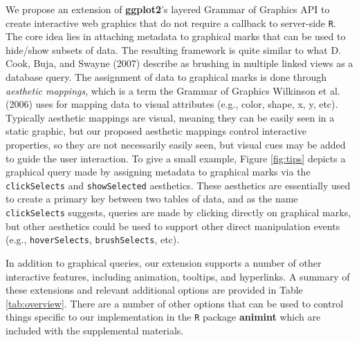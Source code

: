 \documentclass[12pt,]{article}
\theoremstyle{definition}
\theoremstyle{definition}
\theoremstyle{definition}
\theoremstyle{remark}
\begin{document}
We propose an extension of \textbf{ggplot2}'s layered Grammar of
Graphics API to create interactive web graphics that do not require a
callback to server-side \texttt{R}. The core idea lies in attaching
metadata to graphical marks that can be used to hide/show subsets of
data. The resulting framework is quite similar to what D. Cook, Buja,
and Swayne (2007) describe as brushing in multiple linked views as a
database query. The assignment of data to graphical marks is done
through \emph{aesthetic mappings}, which is a term the Grammar of
Graphics Wilkinson et al. (2006) uses for mapping data to visual
attributes (e.g., color, shape, x, y, etc). Typically aesthetic mappings
are visual, meaning they can be easily seen in a static graphic, but our
proposed aesthetic mappings control interactive properties, so they are
not necessarily easily seen, but visual cues may be added to guide the
user interaction. To give a small example, Figure \ref{fig:tips} depicts
a graphical query made by assigning metadata to graphical marks via the
\texttt{clickSelects} and \texttt{showSelected} aesthetics. These
aesthetics are essentially used to create a primary key between two
tables of data, and as the name \texttt{clickSelects} suggests, queries
are made by clicking directly on graphical marks, but other aesthetics
could be used to support other direct manipulation events (e.g.,
\texttt{hoverSelects}, \texttt{brushSelects}, etc).

In addition to graphical queries, our extension supports a number of
other interactive features, including animation, tooltips, and
hyperlinks. A summary of these extensions and relevant additional
options are provided in Table \ref{tab:overview}. There are a number of
other options that can be used to control things specific to our
implementation in the \texttt{R} package \textbf{animint} which are
included with the supplemental materials.
\end{document}
